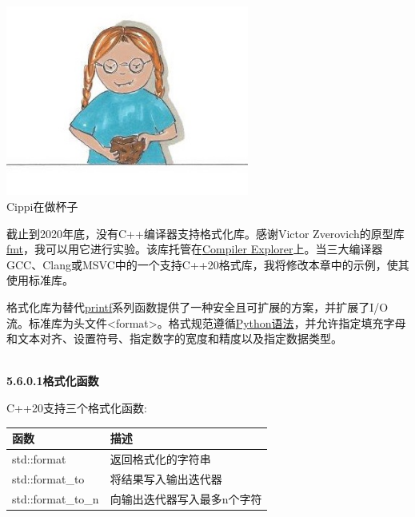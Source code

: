 \begin{center}
\includegraphics[width=0.6\textwidth]{content/3/chapter5/images/29.png}\\
Cippi在做杯子
\end{center}

\begin{tcolorbox}[breakable,enhanced jigsaw,colback=blue!5!white,colframe=blue!75!black,title={缺少编译器支持}]
	
截止到2020年底，没有C++编译器支持格式化库。感谢Victor Zverovich的原型库\href{https://github.com/fmtlib/fmt}{fmt}，我可以用它进行实验。该库托管在\href{https://godbolt.org/z/Eq5763}{Compiler Explorer}上。当三大编译器GCC、Clang或MSVC中的一个支持C++20格式库，我将修改本章中的示例，使其使用标准库。
	
\end{tcolorbox}

格式化库为替代\href{https://en.cppreference.com/w/cpp/io/c/fprintf}{printf}系列函数提供了一种安全且可扩展的方案，并扩展了I/O流。标准库为头文件<format>。格式规范遵循\href{https://docs.python.org/3/library/stdtypes.html#str.format}{Python语法}，并允许指定填充字母和文本对齐、设置符号、指定数字的宽度和精度以及指定数据类型。

\hspace*{\fill} \\ %
\noindent
\textbf{5.6.0.1\hspace{0.2cm}格式化函数}

C++20支持三个格式化函数:

\begin{table}[H]
\centering
\begin{tabular}{ll}
\textbf{函数}  & \textbf{描述}                               \\ \hline
std::format        & 返回格式化的字符串                      \\
std::format\_to    & 将结果写入输出迭代器           \\
std::format\_to\_n & 向输出迭代器写入最多n个字符
\end{tabular}
\end{table}

